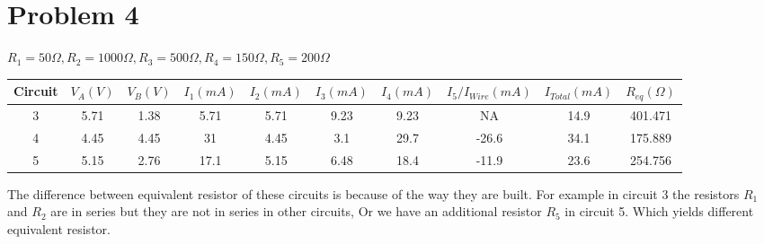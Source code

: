 \documentclass{report}
\begin{document}
    \section*{Problem 4}
    \begin{center}
        $R_1 = 50\Omega, R_2 = 1000\Omega, R_3 = 500\Omega, R_4 = 150\Omega, R_5 = 200\Omega$
	    \renewcommand{\arraystretch}{1.5}
        \begin{tabular}{|c|c|c|c|c|c|c|c|c|c|}
            \hline
            \textbf{Circuit} & \textbf{$V_A(V)$} & \textbf{$V_B(V)$} & \textbf{$I_1(mA)$} & \textbf{$I_2(mA)$} & \textbf{$I_3(mA)$} & \textbf{$I_4(mA)$} & \textbf{$I_5/I_{Wire}(mA)$} & \textbf{$I_{Total}(mA)$} & \textbf{$R_{eq}(\Omega)$} \\
            \hline
            3 & 5.71 & 1.38 & 5.71 & 5.71 & 9.23 & 9.23 & NA & 14.9 & 401.471 \\
            4 & 4.45 & 4.45 & 31 & 4.45 & 3.1 & 29.7 & -26.6 & 34.1 & 175.889 \\
            5 & 5.15 & 2.76 & 17.1 & 5.15 & 6.48 & 18.4 & -11.9 & 23.6 & 254.756 \\
            \hline
        \end{tabular}
    \end{center}

    The difference between equivalent resistor of these circuits is because of the way they are built.
    For example in circuit 3 the resistors $R_1$ and $R_2$ are in series but they are not in series in other circuits,
    Or we have an additional resistor $R_5$ in circuit 5.
    Which yields different equivalent resistor.
\end{document}
